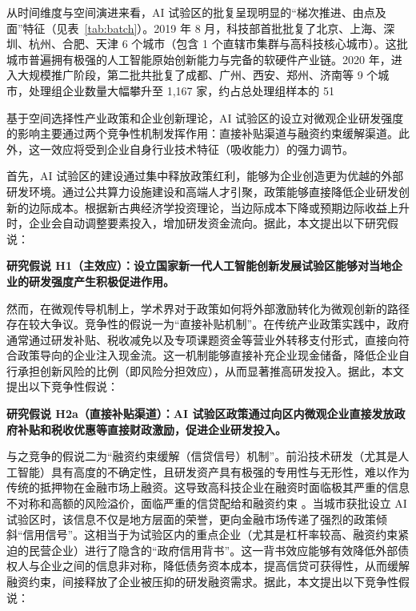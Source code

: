 \documentclass[12pt,hyperref,a4paper,UTF8]{ctexart}
\begin{document}
从时间维度与空间演进来看，AI 试验区的批复呈现明显的“梯次推进、由点及面”特征（见表~\ref{tab:batch}）。2019 年 8 月，科技部首批批复了北京、上海、深圳、杭州、合肥、天津 6 个城市（包含 1 个直辖市集群与高科技核心城市）。这批城市普遍拥有极强的人工智能原始创新能力与完备的软硬件产业链。2020 年，进入大规模推广阶段，第二批共批复了成都、广州、西安、郑州、济南等 9 个城市，处理组企业数量大幅攀升至 1,167 家，约占总处理组样本的 51%

基于空间选择性产业政策和企业创新理论，AI 试验区的设立对微观企业研发强度的影响主要通过两个竞争性机制发挥作用：直接补贴渠道与融资约束缓解渠道。此外，这一效应将受到企业自身行业技术特征（吸收能力）的强力调节。

首先，AI 试验区的建设通过集中释放政策红利，能够为企业创造更为优越的外部研发环境。通过公共算力设施建设和高端人才引聚，政策能够直接降低企业研发创新的边际成本。根据新古典经济学投资理论，当边际成本下降或预期边际收益上升时，企业会自动调整要素投入，增加研发资金流向。据此，本文提出以下研究假说：

\textbf{研究假说 H1（主效应）：设立国家新一代人工智能创新发展试验区能够对当地企业的研发强度产生积极促进作用。}

然而，在微观传导机制上，学术界对于政策如何将外部激励转化为微观创新的路径存在较大争议。竞争性的假说一为“直接补贴机制”。在传统产业政策实践中，政府通常通过研发补贴、税收减免以及专项课题资金等营业外转移支付形式，直接向符合政策导向的企业注入现金流。这一机制能够直接补充企业现金储备，降低企业自行承担创新风险的比例（即风险分担效应），从而显著推高研发投入。据此，本文提出以下竞争性假说：

\textbf{研究假说 H2a（直接补贴渠道）：AI 试验区政策通过向区内微观企业直接发放政府补贴和税收优惠等直接财政激励，促进企业研发投入。}

与之竞争的假说二为“融资约束缓解（信贷信号）机制”。前沿技术研发（尤其是人工智能）具有高度的不确定性，且研发资产具有极强的专用性与无形性，难以作为传统的抵押物在金融市场上融资。这导致高科技企业在融资时面临极其严重的信息不对称和高额的风险溢价，面临严重的信贷配给和融资约束 \parencite{hall2010financing}。当城市获批设立 AI 试验区时，该信息不仅是地方层面的荣誉，更向金融市场传递了强烈的政策倾斜“信用信号”。这相当于为试验区内的重点企业（尤其是杠杆率较高、融资约束紧迫的民营企业）进行了隐含的“政府信用背书”。这一背书效应能够有效降低外部债权人与企业之间的信息非对称，降低债务资本成本，提高信贷可获得性，从而缓解融资约束，间接释放了企业被压抑的研发融资需求。据此，本文提出以下竞争性假说：
\end{document}
